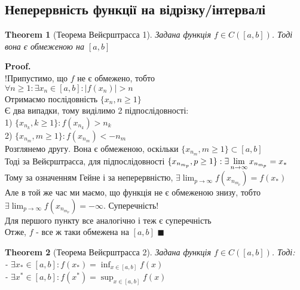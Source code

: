 \documentclass[a4paper, 14pt]{extarticle}
\def\huge{\displaystyle}
\theoremstyle{theoremdd}
\newtheorem{theorem}{Theorem}[subsection]
\theoremstyle{theoremdd}
\theoremstyle{theoremdd}
\theoremstyle{theoremdd}
\theoremstyle{theoremdd}
\theoremstyle{theoremdd}
\theoremstyle{theoremdd}
\theoremstyle{theoremdd}
\newenvironment{pf}{\vspace*{-3mm} \textbf{Proof. \\}}{$\blacksquare$}
\begin{document}
\subsection{Неперервність функції на відрізку/інтервалі}
\begin{theorem}[Теорема Вейєрштрасса 1]
Задана функція $f \in C([a,b])$. Тоді вона є обмеженою на $[a,b]$
\end{theorem}

\begin{pf}
!Припустимо, що $f$ не є обмежено, тобто\\
$\forall n \geq 1: \exists x_n \in [a,b]: |f(x_n)| > n$\\
Отримаємо послідовність $\{x_n,n \geq 1\}$\\
Є два випадки, тому виділимо 2 підпослідовності:\\
1) $\{x_{n_k}, k \geq 1\}: f(x_{n_k})>n_k$\\
2) $\{x_{n_m}, m \geq 1\}: f(x_{n_m})<-n_m$\\
Розглянемо другу. Вона є обмеженою, оскільки $\{x_{n_m}, m \geq 1\} \subset [a,b]$\\
Тоді за Вейєрштрасса, для підпослідовності $\{x_{n_{m_p}}, p \geq 1\}: \\ \exists \huge \lim_{n \to \infty} x_{n_{m_p}} =x_*$\\
Тому за означенням Гейне і за неперервністю, $\exists \huge \lim_{p \to \infty} f(x_{n_{m_p}}) = f(x_*)$\\
Але в той же час ми маємо, що функція не є обмеженою знизу, тобто $\exists \huge \lim_{p \to \infty} f(x_{n_{m_p}}) = -\infty$. Суперечність!\\
Для першого пункту все аналогічно і теж є суперечність\\
Отже, $f$ - все ж таки обмежена на $[a,b]$
\end{pf}

\begin{theorem}[Теорема Вейєрштрасса 2]
Задана функція $f \in C([a,b])$. Тоді:\\
- $\huge \exists x_* \in [a,b]: f(x_*) = \inf_{x \in [a,b]} f(x)$\\
- $\huge \exists x^* \in [a,b]: f(x^*) = \sup_{x \in [a,b]} f(x)$
\end{theorem}
\end{document}
